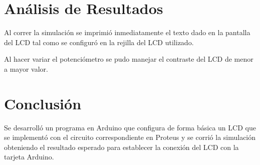 \documentclass{article}
\begin{document}
    \section{Análisis de Resultados}\label{sec:análisis-de-resultados}

    Al correr la simulación se imprimió inmediatamente el texto dado en la
    pantalla del LCD tal como se configuró en la rejilla del LCD utilizado.

    \bigbreak

    Al hacer variar el potenciómetro se pudo manejar el contraste del LCD de
    menor a mayor valor.

    \section{Conclusión}\label{sec:conclusion}

    Se desarrolló un programa en Arduino que configura de forma básica un LCD
    que se implementó con el circuito correspondiente en Proteus y se corrió
    la simulación obteniendo el resultado esperado para establecer la
    conexión del LCD con la tarjeta Arduino.

    \printbibliography
\end{document}

